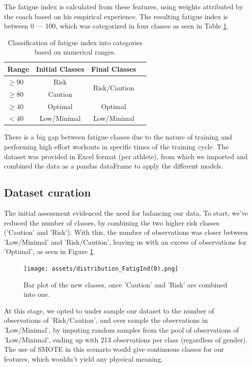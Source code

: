 \documentclass[conference]{IEEEtran}
\begin{document}
The fatigue index is calculated from these features, using weights attributed by the coach based on his empirical experience. The resulting fatigue index is between 0 — 100, which was categorized in four classes as seen in Table \ref{classTable}. 


\begin{table}[H]
\centering
\caption{Classification of fatigue index into categories based on numerical ranges.}
\label{classTable}
\begin{tabular}{lccc}
\toprule
\textbf{Range} & \textbf{Initial Classes} & \textbf{Final Classes} \\
\midrule
$\geq  90$ & Risk & \multirow{2}{*}{Risk/Caution} \\
$\geq  80$ & Caution & \\
$\geq 40$ & Optimal & Optimal \\
$< 40$ & Low/Minimal & Low/Minimal \\
\bottomrule
\end{tabular}
\end{table}


There is a big gap between fatigue classes due to the nature of training and performing high effort workouts in specific times of the training cycle. The dataset was provided in Excel format (per athlete), from which we imported and combined the data as a pandas dataFrame to apply the different models.



\subsection{Dataset curation}

The initial assessment evidenced the need for balancing our data. To start, we've reduced the number of classes, by combining the two higher risk classes ('Caution' and 'Risk'). With this, the number of observations was closer between 'Low/Minimal' and 'Risk/Caution', leaving us with an excess of observations for 'Optimal', as seen in Figure \ref{histClasses}. 

\begin{figure}[H]
    \centering
    \texttt{[image: assets/distribution\_FatigInd(0).png]}
    \caption{Bar plot of the new classes, once 'Caution' and 'Risk' are combined into one.}
    \label{histClasses}
\end{figure} %

At this stage, we opted to under sample our dataset to the number of observations of 'Risk/Caution', and over sample the observations in 'Low/Minimal', by imputing random samples from the pool of observations of 'Low/Minimal', ending up with 213 observations per class (regardless of gender). The use of SMOTE in this scenario would give continuous classes for our features, which wouldn't yield any physical meaning.
\end{document}
